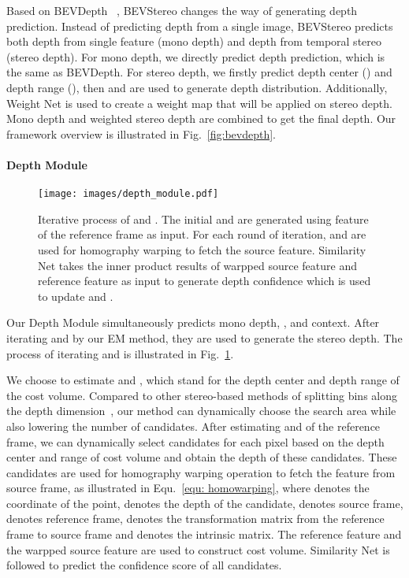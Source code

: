 \documentclass[letterpaper]{article} \usepackage[]{aaai23}  \usepackage{times}  \usepackage{helvet}  \usepackage{courier}  \usepackage[hyphens]{url}  \usepackage{graphicx} \urlstyle{rm} \def\UrlFont{\rm}  \usepackage{natbib}  \usepackage{caption} \frenchspacing  \setlength{\pdfpagewidth}{8.5in} \setlength{\pdfpageheight}{11in} \usepackage{algorithm}
\begin{document}
Based on BEVDepth ~\cite{li2022bevdepth}, BEVStereo changes the way of generating depth prediction. Instead of predicting depth from a single image, BEVStereo predicts both depth from single feature (mono depth) and depth from temporal stereo (stereo depth). For mono depth, we directly predict depth prediction, which is the same as BEVDepth. For stereo depth, we firstly predict depth center () and depth range (), then  and  are used to generate depth distribution. Additionally, Weight Net is used to create a weight map that will be applied on stereo depth. Mono depth and weighted stereo depth are combined to get the final depth. Our framework overview is illustrated in Fig.~\ref{fig:bevdepth}. 

\paragraph{Depth Module}
\begin{figure}[t]
\texttt{[image: images/depth\_module.pdf]}
\centering
\caption{Iterative process of  and . The initial  and  are generated using feature of the reference frame as input. For each round of iteration,  and  are used for homography warping to fetch the source feature. Similarity Net takes the inner product results of warpped source feature and reference feature as input to generate depth confidence which is used to update  and .}
\label{fig:depth_module}
\end{figure}
Our Depth Module simultaneously predicts  mono depth, ,  and context. After iterating  and  by our EM method, they are used to generate the stereo depth. The process of iterating  and  is illustrated in Fig.~\ref{fig:depth_module}.

We choose to estimate  and , which stand for the depth center and depth range of the cost volume.
Compared to other stereo-based methods of splitting bins along the depth dimension~\cite{yao2018mvsnet, wang2022mv}, our method can dynamically choose the search area while also lowering the number of candidates. After estimating  and  of the reference frame, we can dynamically select candidates for each pixel based on the depth center and range of cost volume and obtain the depth of these candidates. These candidates are used for homography warping operation to fetch the feature from source frame, as illustrated in Equ.~\ref{equ: homowarping}, where  denotes the coordinate of the point,  denotes the depth of the candidate,  denotes source frame,  denotes reference frame,  denotes the transformation matrix from the reference frame to source frame and  denotes the intrinsic matrix. The reference feature and the warpped source feature are used to construct cost volume. Similarity Net is followed to predict the confidence score of all candidates.
\end{document}
